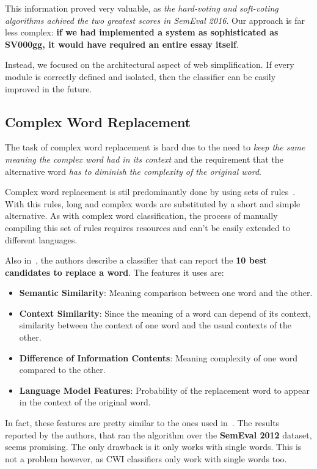 \documentclass[11pt,a4paper]{article}
\begin{document}
This information proved very valuable, as \emph{the hard-voting and soft-voting algorithms achived the two greatest scores in SemEval 2016}. Our approach is far less complex: \textbf{if we had implemented a system as sophisticated as SV000gg, it would have required an entire essay itself}.

Instead, we focused on the architectural aspect of web simplification. If every module is correctly defined and isolated, then the classifier can be easily improved in the future.

\subsection{Complex Word Replacement}

The task of complex word replacement is hard due to the need to \emph{keep the same meaning the complex word had in its context} and the requirement that the alternative word \emph{has to diminish the complexity of the original word}.

Complex word replacement is stil predominantly done by using sets of rules~\cite{glavavs2015simplifying}. With this rules, long and complex words are substituted by a short and simple alternative. As with complex word classification, the process of manually compiling this set of rules requires resources and can't be easily extended to different languages.

Also in~\cite{glavavs2015simplifying}, the authors describe a classifier that can report the \textbf{10 best candidates to replace a word}. The features it uses are:

\begin{itemize}
	\item{\textbf{Semantic Similarity}: Meaning comparison between one word and the other.}
	\item{\textbf{Context Similarity}: Since the meaning of a word can depend of its context, similarity between the context of one word and the usual contexts of the other.}
	\item{\textbf{Difference of Information Contents}: Meaning complexity of one word compared to the other.}
	\item{\textbf{Language Model Features}: Probability of the replacement word to appear in the context of the original word.}
\end{itemize}

In fact, these features are pretty similar to the ones used in~\cite{paetzold2016sv000gg}. The results reported by the authors, that ran the algorithm over the \textbf{SemEval 2012} dataset, seems promising. The only drawback is it only works with single words. This is not a problem however, as CWI classifiers only work with single words too.
\end{document}

